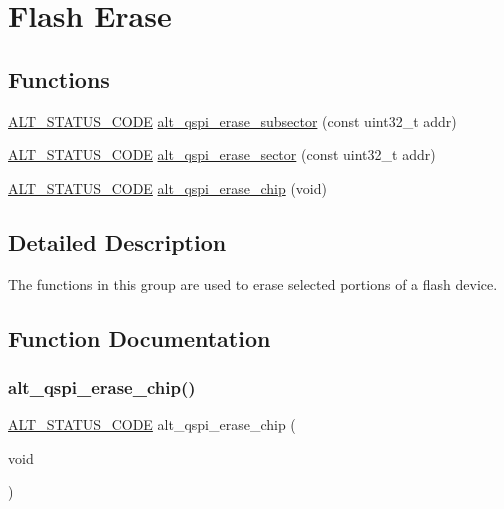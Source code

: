 \hypertarget{group__ALT__QSPI__ERASE}{}\section{Flash Erase}
\label{group__ALT__QSPI__ERASE}
\subsection*{Functions}
\begin{DoxyCompactItemize}
\item 
\mbox{\hyperlink{hwlib_8h_abdb0d369f069723ca55d6c94bcaaaa12}{A\+L\+T\+\_\+\+S\+T\+A\+T\+U\+S\+\_\+\+C\+O\+DE}} \mbox{\hyperlink{group__ALT__QSPI__ERASE_ga88347ce19e1f6289dd4df5b25e7758aa}{alt\+\_\+qspi\+\_\+erase\+\_\+subsector}} (const uint32\+\_\+t addr)
\item 
\mbox{\hyperlink{hwlib_8h_abdb0d369f069723ca55d6c94bcaaaa12}{A\+L\+T\+\_\+\+S\+T\+A\+T\+U\+S\+\_\+\+C\+O\+DE}} \mbox{\hyperlink{group__ALT__QSPI__ERASE_ga862192048f797c8387b71a8165e61944}{alt\+\_\+qspi\+\_\+erase\+\_\+sector}} (const uint32\+\_\+t addr)
\item 
\mbox{\hyperlink{hwlib_8h_abdb0d369f069723ca55d6c94bcaaaa12}{A\+L\+T\+\_\+\+S\+T\+A\+T\+U\+S\+\_\+\+C\+O\+DE}} \mbox{\hyperlink{group__ALT__QSPI__ERASE_gaaeba262ced6f5cc1f671bf3d17f681bb}{alt\+\_\+qspi\+\_\+erase\+\_\+chip}} (void)
\end{DoxyCompactItemize}


\subsection{Detailed Description}
The functions in this group are used to erase selected portions of a flash device. 

\subsection{Function Documentation}
\mbox{\label{group__ALT__QSPI__ERASE_gaaeba262ced6f5cc1f671bf3d17f681bb}} 
\subsubsection{\texorpdfstring{alt\_qspi\_erase\_chip()}{alt\_qspi\_erase\_chip()}}
{\footnotesize\ttfamily \mbox{\hyperlink{hwlib_8h_abdb0d369f069723ca55d6c94bcaaaa12}{A\+L\+T\+\_\+\+S\+T\+A\+T\+U\+S\+\_\+\+C\+O\+DE}} alt\+\_\+qspi\+\_\+erase\+\_\+chip (\begin{DoxyParamCaption}\item[{void}]{ }\end{DoxyParamCaption})}

